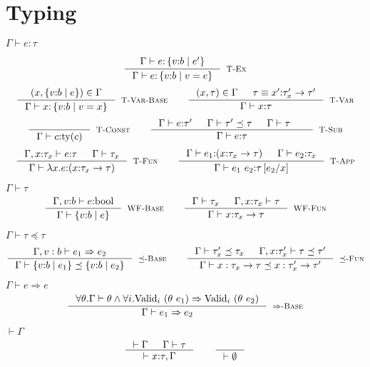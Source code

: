 \documentclass[10pt,a4paper]{article}
\newcommand\rulename[1]{\textsc{#1}\xspace}
\newcommand\rwbase{\rulename{WF-Base}}
\newcommand\rwfun{\rulename{WF-Fun}}
\newcommand\rsubbase{\ensuremath{\preceq}\rulename{-Base}}
\newcommand\rsubfun{\ensuremath{\preceq}\rulename{-Fun}}
\newcommand\rtvar{\rulename{T-Var}}
\newcommand\rtvarbase{\rulename{T-Var-Base}}
\newcommand\rtconst{\rulename{T-Const}}
\newcommand\rtsub{\rulename{T-Sub}}
\newcommand\rtexact{\rulename{T-Ex}}
\newcommand\rtfun{\rulename{T-Fun}}
\newcommand\rtapp{\rulename{T-App}}
\newcommand\rimpl{\ensuremath{\Rightarrow}\rulename{-Base}}
\newcommand\efun[2]{\ensuremath{\lambda #1 . #2}}
\newcommand\eapp[2]{\ensuremath{#1 \ #2}}
\newcommand\tbool{\ensuremath{\text{bool}}}
\newcommand\tref[3]{\ensuremath{\left\lbrace #1 \colon #2 \mid #3 \right\rbrace}}
\newcommand\tfun[3]{\ensuremath{#1\colon #2 \rightarrow #3}}
\newcommand\validi[1]{\ensuremath{\text{Valid}_{i}\ (#1)}}
\newcommand\generalconditionImpl[2]
	{\ensuremath{\forall i . \validi{#1} \Rightarrow \validi{#2}}}
\newcommand\ty[1]{\ensuremath{\text{ty}({#1})}}
\newcommand\sub[2]{\ensuremath{\left[ #2 / #1 \right]}}
\newcommand\hastype[3]{\ensuremath{#1 \vdash #2 \colon #3}}
\newcommand\iswellformed[2]{\ensuremath{#1 \vdash #2}}
\newcommand\issubtype[3]{\ensuremath{#1 \vdash #2 \preceq #3}}
\newcommand\issubref[3]{\ensuremath{#1 \vdash #2 \Rightarrow #3}}
\begin{document}
\section*{Typing}

\hfill\mbox{\hastype{\Gamma}{e}{\tau}}

$$
\inference{
	\hastype{\Gamma}{e}{\tref{v}{b}{e'}}
}{
	\hastype{\Gamma}{e}{\tref{v}{b}{v = e}}
}[\rtexact]
$$
$$
\inference{
	(x,\tref{v}{b}{e}) \in \Gamma
}{
	\hastype{\Gamma}{x}{\tref{v}{b}{v=x}}
}[\rtvarbase]
\qquad
\inference{
	(x,\tau) \in \Gamma &&
	\tau \equiv \tfun{x'}{\tau_x'}{\tau'}
}{
	\hastype{\Gamma}{x}{\tau}
}[\rtvar]
$$
$$
\inference{
}{
	\hastype{\Gamma}{c}{\ty{c}}
}[\rtconst]
\qquad
\inference{
	\hastype{\Gamma}{e}{\tau'} &&
	\issubtype{\Gamma}{\tau'}{\tau} &&
	\iswellformed{\Gamma}{\tau} &&
}{
	\hastype{\Gamma}{e}{\tau}
}[\rtsub]
$$
$$
\inference{
	\hastype{\Gamma, x\colon\tau_x}{e}{\tau} &&
	\iswellformed{\Gamma}{\tau_x}
}{
	\hastype{\Gamma}{\efun{x}{e}}{(\tfun{x}{\tau_x}{\tau})}
}[\rtfun]
\qquad
\inference{
	\hastype{\Gamma}{e_1}{(\tfun{x}{\tau_{x}}{\tau})} &&
	\hastype{\Gamma}{e_2}{\tau_{x}}
}{
	\hastype{\Gamma}{\eapp{e_1}{e_2}}{\tau\sub{x}{e_2}}
}[\rtapp]
$$


\hfill\mbox{\iswellformed{\Gamma}{\tau}}
$$
\inference{
	\hastype{\Gamma, v\colon b}{e}{\tbool}
}{
	\iswellformed{\Gamma}{\tref{v}{b}{e}}
}[\rwbase]
\qquad
\inference{
	\iswellformed{\Gamma}{\tau_x} &&
	\iswellformed{\Gamma, x \colon \tau_x}{\tau}
}{
	\iswellformed{\Gamma}{\tfun{x}{\tau_x}{\tau}}
}[\rwfun]
$$

\hfill\mbox{\issubtype{\Gamma}{\tau}{\tau}}
$$
\inference{
	\issubref{\Gamma, v:b}{e_1}{e_2}
}{
	\issubtype{\Gamma}{\tref{v}{b}{e_1}}{\tref{v}{b}{e_2}}
}[\rsubbase]
\qquad
\inference{
	\issubtype{\Gamma}{\tau'_x}{\tau_x} &&
	\issubtype{\Gamma, x \colon \tau'_x}{\tau}{\tau'}
}{
	\issubtype{\Gamma}{x:\tau_x \rightarrow \tau}{x:\tau'_x \rightarrow \tau'}
}[\rsubfun]
$$

\hfill\mbox{\issubref{\Gamma}{e}{e}}
$$
\inference{
	\forall \theta. \iswellformed{\Gamma}{\theta} \land
	\generalconditionImpl{\theta\ e_1}{\theta\ e_2}
}{
	\issubref{\Gamma}{e_1}{e_2}
}[\rimpl]
$$

\hfill\mbox{\iswellformed{}{\Gamma}}
$$
\inference{
	\iswellformed{}{\Gamma} &&
	\iswellformed{\Gamma}{\tau}
}{
	\iswellformed{}{x\colon\tau,\Gamma}
}
\qquad
\inference{}{\iswellformed{}{\emptyset}}
$$
\end{document}
